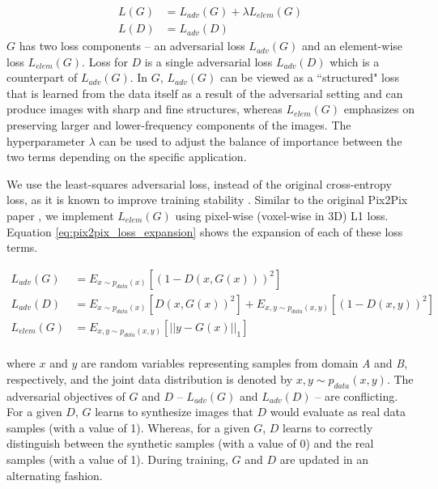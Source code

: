 \begin{equation}
    \begin{aligned}
    L(G) &= L_{adv}(G) + \lambda L_{elem}(G) \\
    L(D) &= L_{adv}(D)
    \end{aligned}
    \label{eq:pix2pix_loss_components}
\end{equation}
$G$ has two loss components -- an adversarial loss $L_{adv}(G)$ and an element-wise loss $L_{elem}(G)$. Loss for $D$ is a single adversarial loss $L_{adv}(D)$ which is a counterpart of $L_{adv}(G)$. In $G$, $L_{adv}(G)$ can be viewed as a ``structured" loss that is learned from the data itself as a result of the adversarial setting and can produce images with sharp and fine structures, whereas $L_{elem}(G)$ emphasizes on preserving larger and lower-frequency components of the images. The hyperparameter $\lambda$ can be used to adjust the balance of importance between the two terms depending on the specific application.

We use the least-squares adversarial loss, instead of the original cross-entropy loss, as it is known to improve training stability \cite{mao2017least}. Similar to the original Pix2Pix paper \cite{isola2017image}, we implement $L_{elem}(G)$ using pixel-wise (voxel-wise in 3D) L1 loss. Equation \ref{eq:pix2pix_loss_expansion} shows the expansion of each of these loss terms.

\begin{equation}
    \begin{aligned}
    L_{adv}(G) &= E_{x \sim p_{data}(x)} [(1 - D(x, G(x)))^2]  \\
    L_{adv}(D) &= E_{x \sim p_{data}(x)} [D(x, G(x))^2] + E_{x,y \sim p_{data}(x,y)} [(1 - D(x,y))^2] \\
    L_{elem}(G) &= E_{x,y \sim p_{data}(x,y)} [|| y - G(x) ||_1]  \\
    \end{aligned}
    \label{eq:pix2pix_loss_expansion}
\end{equation}

where $x$ and $y$ are random variables representing samples from domain \textit{A} and \textit{B}, respectively, and the joint data distribution is denoted by $x,y \sim p_{data}(x,y)$. The adversarial objectives of $G$ and $D$ -- $L_{adv}(G)$ and $L_{adv}(D)$ -- are conflicting. For a given $D$, $G$ learns to synthesize images that $D$ would evaluate as real data samples (with a value of 1). Whereas, for a given $G$, $D$ learns to correctly distinguish between the synthetic samples (with a value of 0) and the real samples (with a value of 1). During training, $G$ and $D$ are updated in an alternating fashion.

